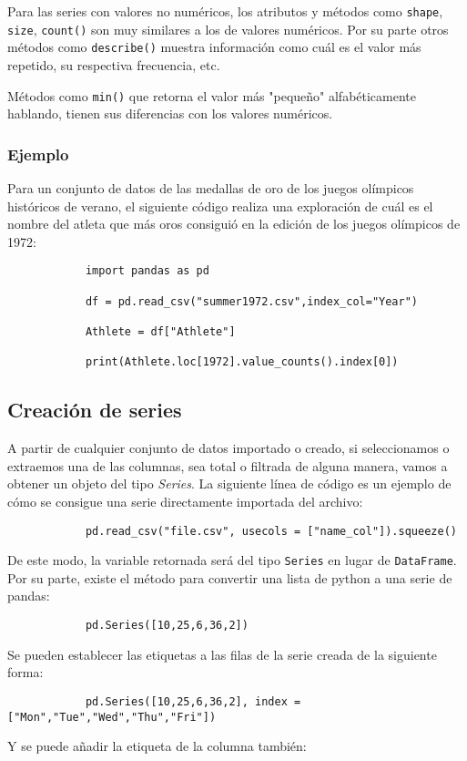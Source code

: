     Para las series con valores no numéricos, los atributos y métodos como \texttt{shape}, \texttt{size}, \texttt{count()} son muy similares a los de valores numéricos. Por su parte otros métodos como \texttt{describe()} muestra información como cuál es el valor más repetido, su respectiva frecuencia, etc.

    Métodos como \texttt{min()} que retorna el valor más "pequeño" alfabéticamente hablando, tienen sus diferencias con los valores numéricos.


    \subsubsection{Ejemplo} Para un conjunto de datos de las medallas de oro de los juegos olímpicos históricos de verano, el siguiente código realiza una exploración de cuál es el nombre del atleta que más oros consiguió en la edición de los juegos olímpicos de 1972:

    \begin{verbatim}
            import pandas as pd
            
            df = pd.read_csv("summer1972.csv",index_col="Year")
            
            Athlete = df["Athlete"]
            
            print(Athlete.loc[1972].value_counts().index[0])
            \end{verbatim}
    \subsection{Creación de series}

    A partir de cualquier conjunto de datos importado o creado, si seleccionamos o extraemos una de las columnas, sea total o filtrada de alguna manera, vamos a obtener un objeto del tipo \textit{Series}.
    La siguiente línea de código es un ejemplo de cómo se consigue una serie directamente importada del archivo:

    \begin{verbatim}
            pd.read_csv("file.csv", usecols = ["name_col"]).squeeze()
            \end{verbatim}
    De este modo, la variable retornada será del tipo \texttt{Series} en lugar de \texttt{DataFrame}.
    Por su parte, existe el método para convertir una lista de python a una serie de pandas:

    \begin{verbatim}
            pd.Series([10,25,6,36,2])
            \end{verbatim}
    Se pueden establecer las etiquetas a las filas de la serie creada de la siguiente forma:
    \begin{verbatim}
            pd.Series([10,25,6,36,2], index = ["Mon","Tue","Wed","Thu","Fri"])
            \end{verbatim}
    Y se puede añadir la etiqueta de la columna también:

